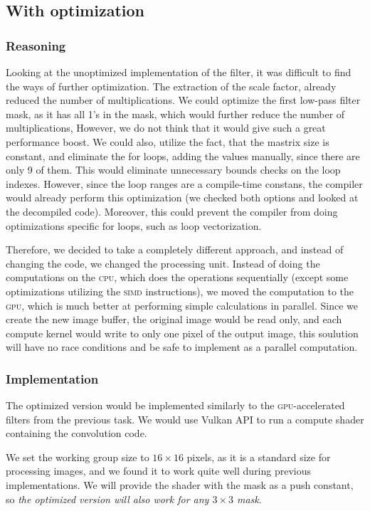\documentclass[12pt]{article}
\begin{document}
\subsection{With optimization}

\subsubsection{Reasoning}

Looking at the unoptimized implementation of the filter, it was difficult to find the ways of further optimization.
The extraction of the scale factor, already reduced the number of multiplications.
We could optimize the first low-pass filter mask, as it has all 1's in the mask, which would further reduce the number of multiplications,
However, we do not think that it would give such a great performance boost.
We could also, utilize the fact, that the mastrix size is constant, and eliminate the for loops, adding the values manually, since there are only 9 of them.
This would eliminate unnecessary bounds checks on the loop indexes.
However, since the loop ranges are a compile-time constans, the compiler would already perform this optimization (we checked both options and looked at the decompiled code).
Moreover, this could prevent the compiler from doing optimizations specific for loops, such as loop vectorization.

Therefore, we decided to take a completely different approach, and instead of changing the code, we changed the processing unit.
Instead of doing the computations on the \textsc{cpu}, which does the operations sequentially (except some optimizations utilizing the \textsc{simd} instructions),
we moved the computation to the \textsc{gpu}, which is much better at performing simple calculations in parallel.
Since we create the new image buffer, the original image would be read only, and each compute kernel would write to only one pixel of the output image,
this soulution will have no race conditions and be safe to implement as a parallel computation.

\subsubsection{Implementation}
The optimized version would be implemented similarly to the \textsc{gpu}-accelerated filters from the previous task.
We would use Vulkan API to run a compute shader containing the convolution code.

We set the working group size to $16\times16$ pixels, as it is a standard size for processing images,
and we found it to work quite well during previous implementations.
We will provide the shader with the mask as a push constant, so \emph{the optimized version will also work for any $3\times3$ mask}.
\end{document}
